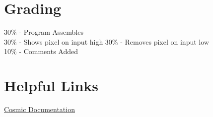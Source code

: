 \documentclass[
	12pt, %
]{fphw}
\begin{document}

\section*{Grading}

30\% - Program Assembles\\
30\% - Shows pixel on input high
30\% - Removes pixel on input low\\
10\% - Comments Added\\




\section*{Helpful Links}
\href{https://github.com/clbx/Cosmic/tree/master/doc}{Cosmic Documentation}\\

\end{document}

